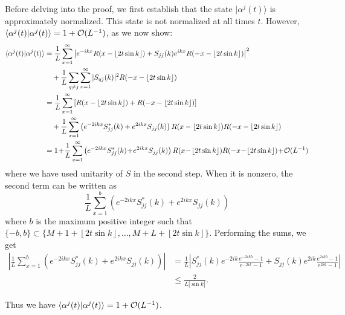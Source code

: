 \documentclass[../thesis-main/thesis-main]{subfiles}
\begin{document}
Before delving into the proof, we first establish that the state $|\alpha^{j}(t)\rangle$ is approximately normalized. This state is not normalized at all times $t$. However, $\langle\alpha^{j}(t)|\alpha^{j}(t)\rangle=1+\mathcal{O}(L^{-1})$, as we now show:
\begin{align*}
\langle\alpha^{j}(t)|\alpha^{j}(t)\rangle & =\frac{1}{L} \sum_{x=1}^{\infty}\left|e^{-ikx}R(x-\left\lfloor 2t\sin k\right\rfloor)+S_{jj}(k)e^{ikx}R(-x-\left\lfloor 2t\sin k\right\rfloor)\right|^{2} \\
 &\quad   +\frac{1}{L}\sum_{q\neq j}\sum_{x=1}^{\infty}|S_{qj}(k)|^{2} R(-x-\left\lfloor 2t\sin k\right\rfloor) \\
 & = \frac{1}{L}\sum_{x=1}^{\infty}\left[R(x-\left\lfloor 2t\sin k\right\rfloor )+R(-x-\left\lfloor 2t\sin k\right\rfloor)\right] \\
 &  \quad +\frac{1}{L}\sum_{x=1}^{\infty}\left(e^{-2ikx}S_{jj}^{\ast}(k)+e^{2ikx}S_{jj}(k)\right)R(x-\left\lfloor 2t\sin k\right\rfloor)R(-x-\left\lfloor 2t\sin k\right\rfloor) \\
 & = 1\! +\! \frac{1}{L}\sum_{x=1}^{\infty}
 	\left(e^{-2ikx}S_{jj}^{\ast}(k)\! +\! e^{2ikx}S_{jj}(k)\right)
   R(x\! -\! \left\lfloor 2t\sin k\right\rfloor)
   R(-x\! -\!\left\lfloor 2t\sin k\right\rfloor)
   \! +\!\OO(L^{-1})
\end{align*}
where we have used unitarity of $S$ in the second step.
When it is nonzero, the second term can be written as
\[
\frac{1}{L}\sum_{x=1}^{b}\left(e^{-2ikx}S_{jj}^{\ast}(k)+e^{2ikx}S_{jj}(k)\right)
\]
where $b$ is the maximum positive integer such that $\{-b,b\}\subset\{M+1+\left\lfloor 2t\sin k\right\rfloor,\ldots,M+L+\left\lfloor 2t\sin k\right\rfloor \}$. Performing
the sums, we get
\begin{align*}
\left|\frac{1}{L}\sum_{x=1}^{b}\left(e^{-2ikx}S_{jj}^{\ast}(k)+e^{2ikx}S_{jj}(k)\right)\right| 
&= \frac{1}{L} \left|S_{jj}^{\ast}(k)e^{-2ik} \frac{e^{-2ikb}-1}{e^{-2ik}-1} 
+
S_{jj}(k)e^{2ik} \frac{e^{2ikb}-1}{e^{2ik}-1} \right|\\
 & \leq \frac{2}{L|{\sin k}|} .
\end{align*}

Thus we have $\langle\alpha^{j}(t)|\alpha^{j}(t)\rangle=1+\mathcal{O}(L^{-1})$.
\end{document}
